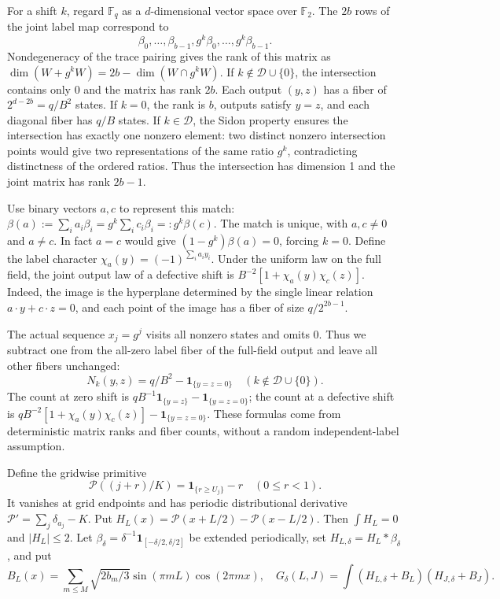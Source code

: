 \documentclass[a4paper,11pt]{article}
\theoremstyle{remark}
\begin{document}
For a shift $k$, regard $\mathbb F_q$ as a $d$-dimensional vector space over $\mathbb F_2$.
The $2b$ rows of the joint label map correspond to
\[
 \beta_0,\ldots,\beta_{b-1},g^k\beta_0,\ldots,g^k\beta_{b-1}.
\]
Nondegeneracy of the trace pairing gives the rank of this matrix as
$\dim(W+g^kW)=2b-\dim(W\cap g^kW)$.
If $k\notin\mathcal D\cup\{0\}$, the intersection contains only 0 and the matrix has rank $2b$.
Each output $(y,z)$ has a fiber of $2^{d-2b}=q/B^2$ states.
If $k=0$, the rank is $b$, outputs satisfy $y=z$, and each diagonal fiber has $q/B$ states.
If $k\in\mathcal D$, the Sidon property ensures the intersection has exactly one nonzero element:
two distinct nonzero intersection points would give two representations of the same ratio $g^k$, contradicting distinctness of the ordered ratios.
Thus the intersection has dimension 1 and the joint matrix has rank $2b-1$.

Use binary vectors $a,c$ to represent this match:
$\beta(a):=\sum_i a_i\beta_i=g^k\sum_i c_i\beta_i=:g^k\beta(c)$.
The match is unique, with $a,c\ne0$ and $a\ne c$. In fact $a=c$ would give
$(1-g^k)\beta(a)=0$, forcing $k=0$.
Define the label character $\chi_a(y)=(-1)^{\sum_i a_iy_i}$.
Under the uniform law on the full field, the joint output law of a defective shift is
$B^{-2}[1+\chi_a(y)\chi_c(z)]$.
Indeed, the image is the hyperplane determined by the single linear relation $a\cdot y+c\cdot z=0$,
and each point of the image has a fiber of size $q/2^{2b-1}$.

The actual sequence $x_j=g^j$ visits all nonzero states and omits 0.
Thus we subtract one from the all-zero label fiber of the full-field output and leave all other fibers unchanged:
\begin{equation}\label{eq:paperlabelcount}
 N_k(y,z)=q/B^2-\mathbf1_{\{y=z=0\}}
 \quad(k\notin\mathcal D\cup\{0\}).
\end{equation}
The count at zero shift is
$qB^{-1}\mathbf1_{\{y=z\}}-\mathbf1_{\{y=z=0\}}$;
the count at a defective shift is
$qB^{-2}[1+\chi_a(y)\chi_c(z)]-\mathbf1_{\{y=z=0\}}$.
These formulas come from deterministic matrix ranks and fiber counts, without a random independent-label assumption.

Define the gridwise primitive
\[
 \mathcal P((j+r)/K)=\mathbf1_{\{r\ge U_j\}}-r\quad(0\le r<1).
\]
It vanishes at grid endpoints and has periodic distributional derivative $\mathcal P'=\sum_j\delta_{a_j}-K$.
Put $H_L(x)=\mathcal P(x+L/2)-\mathcal P(x-L/2)$. Then $\int H_L=0$ and $|H_L|\le2$.
Let $\beta_\delta=\delta^{-1}\mathbf1_{[-\delta/2,\delta/2]}$ be extended periodically,
set $H_{L,\delta}=H_L*\beta_\delta$, and put
\[
 B_L(x)=\sum_{m\le M}\sqrt{2b_m/3}\sin(\pi mL)\cos(2\pi mx),
 \quad G_\delta(L,J)=\int(H_{L,\delta}+B_L)(H_{J,\delta}+B_J).
\]
\end{document}
